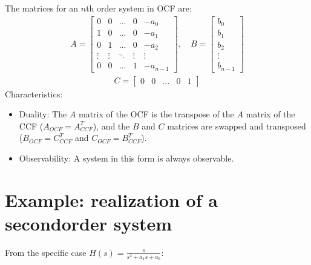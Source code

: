 \documentclass[letterpaper,10pt,english]{jupyterBook}
\begin{document}
\sphinxAtStartPar
{}

\sphinxAtStartPar
The matrices for an \(n\)\sphinxhyphen{}th order system in OCF are:
\begin{equation*}
\begin{split}A = \begin{bmatrix} 
0 & 0 & \dots & 0 & -a_0 \\
1 & 0 & \dots & 0 & -a_1 \\
0 & 1 & \dots & 0 & -a_2 \\
\vdots & \vdots & \ddots & \vdots & \vdots \\
0 & 0 & \dots & 1 & -a_{n-1}
\end{bmatrix}, \quad
B = \begin{bmatrix} b_0 \\ b_1 \\ b_2 \\ \vdots \\ b_{n-1} \end{bmatrix}\end{split}
\end{equation*}\begin{equation*}
\begin{split}C = \begin{bmatrix} 0 & 0 & \dots & 0 & 1 \end{bmatrix}\end{split}
\end{equation*}
\sphinxAtStartPar
Characteristics:
\begin{itemize}
\item {} 
\sphinxAtStartPar
Duality: The \(A\) matrix of the OCF is the transpose of the \(A\) matrix of the CCF (\(A_{OCF} = A_{CCF}^T\)), and the \(B\) and \(C\) matrices are swapped and transposed (\(B_{OCF} = C_{CCF}^T\) and \(C_{OCF} = B_{CCF}^T\)).

\item {} 
\sphinxAtStartPar
Observability: A system in this form is always observable.

\end{itemize}


\section{Example: realization of a second\sphinxhyphen{}order system}
\label{\detokenize{ch/system-theory/realizations:example-realization-of-a-second-order-system}}
\sphinxAtStartPar
From the specific case \(H(s) = \frac{s}{s^2 + a_1s + a_0}\):
\end{document}
